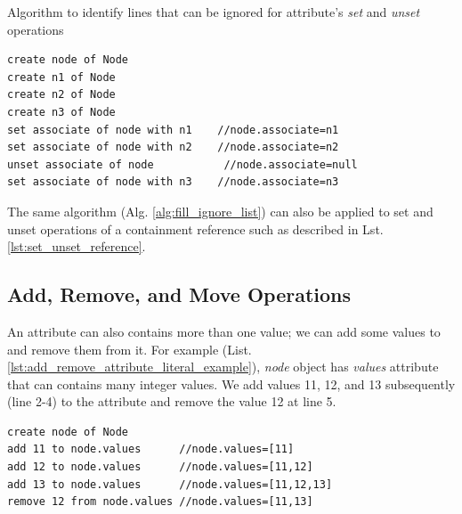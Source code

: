 \documentclass[sigconf]{acmart}
\begin{document}
\begin{algorithm}
\caption{Algorithm to identify lines that can be ignored for attribute's \emph{set} and \emph{unset} operations}
\label{alg:fill_ignore_list}
\end{algorithm}


\begin{lstlisting}[style=eol,caption={Example of CBP representation of \emph{name} reference assignments.},label=lst:set_unset_reference]
create node of Node
create n1 of Node
create n2 of Node
create n3 of Node
set associate of node with n1    //node.associate=n1
set associate of node with n2    //node.associate=n2
unset associate of node           //node.associate=null
set associate of node with n3    //node.associate=n3
\end{lstlisting}

The same algorithm (Alg. \ref{alg:fill_ignore_list}) can also be applied to set and unset operations of a containment reference such as described in Lst. \ref{lst:set_unset_reference}. 


\subsection{Add, Remove, and Move Operations}
\label{subsec:add_remove_and_move_operations}
An attribute can also contains more than one value; we can add some values to and remove them from it. For example (List. \ref{lst:add_remove_attribute_literal_example}), \emph{node} object has \emph{values} attribute that can contains many integer values. We add values 11, 12, and 13 subsequently (line 2-4) to the attribute and remove the value 12 at line 5. 

\begin{lstlisting}[style=eol,caption={Example of CBP representation of attribute \emph{values}'s add and remove operations.},label=lst:add_remove_attribute_literal_example]
create node of Node
add 11 to node.values      //node.values=[11] 
add 12 to node.values      //node.values=[11,12] 
add 13 to node.values      //node.values=[11,12,13] 
remove 12 from node.values //node.values=[11,13] 
\end{lstlisting}
\end{document}

